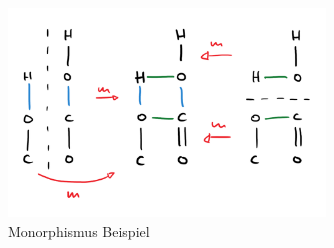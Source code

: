 \begin{figure}
    \centering
    \includegraphics[width=0.75\textwidth]{figures/monomorphism.png}
    \caption{Monorphismus Beispiel}
    \label{fig:monomorphism}
\end{figure}


